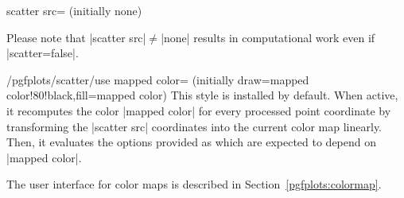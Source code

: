 {\begin{pgfplotskey}{scatter src= (initially none)%
}
\begin{codeexample}
\end{codeexample}

    Please note that |scatter src|$\neq$|none| results in computational work
    even if |scatter=false|.
\end{pgfplotskey}

\begin{stylekey}{/pgfplots/scatter/use mapped color=
    (initially draw=mapped color!80!black,fill=mapped color)%
}
    This style is installed by default. When active, it recomputes the color
    |mapped color| for every processed point coordinate by transforming the
    |scatter src| coordinates into the current color map linearly. Then, it
    evaluates the options provided as  which are
    expected to depend on |mapped color|.

    The user interface for color maps is described in
    Section~\ref{pgfplots:colormap}.

\begin{codeexample}[]
\end{codeexample}


\end{stylekey}}
